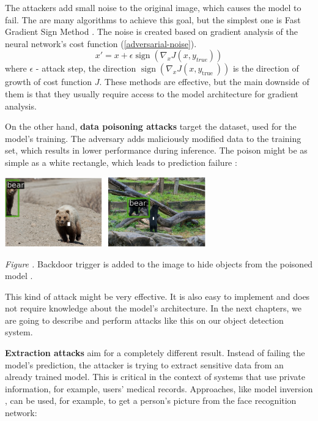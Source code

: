 \documentclass[14pt,a4paper]{extarticle}
\newcounter{e}
\newcounter{pic}
\newcommand{\pic}[1]{\refstepcounter{pic} \vspace{-0.3cm}\textit{Figure \arabic{pic}\label{#1}.}}
\numberwithin{equation}{section}
\numberwithin{figure}{section}
\begin{document}
The attackers add small noise to the original image, which causes the model to fail. The are many algorithms to achieve this goal, but the simplest one is
Fast Gradient Sign Method \cite{fgsm}. The noise is created based on gradient analysis of the neural network's cost function (\ref{adversarial-noise}).
\begin{equation}
    \label{adversarial-noise}
x'=x+\epsilon \operatorname{sign}\left(\nabla_x J\left(x, y_{t r u e}\right)\right)
\end{equation}
where $\epsilon$ - attack step, the direction $\operatorname{sign}\left(\nabla_x J\left(x, y_{\text {true }}\right)\right)$ is the direction of growth of cost function $J$. These methods are effective, but the main downside of them is that they usually require access to the model architecture for gradient analysis.

On the other hand, \textbf{data poisoning attacks} target the dataset, used for the model's training. The adversary adds maliciously modified data to the training set, which results in lower performance during inference. The poison might be as simple as a white rectangle, which leads to prediction failure \cite{white-rectangle}:

\begin{center}
    \includegraphics[height=3cm]{images/bear.png}
\end{center}
\begin{center}
    \pic{bear} Backdoor trigger is added to the image to hide objects from the poisoned model \cite{white-rectangle}.
\end{center}
This kind of attack might be very effective. It is also easy to implement and does not require knowledge about the model's architecture. In the next chapters, we are going to describe and perform attacks like this on our object detection system.

\textbf{Extraction attacks} aim for a completely different result. Instead of failing the model's prediction, the attacker is trying to extract sensitive data from an already trained model. This is critical in the context of systems that use private information, for example, users' medical records. Approaches, like model inversion \cite{model-inversion}, can be used, for example, to get a person's picture from the face recognition network:
\end{document}
